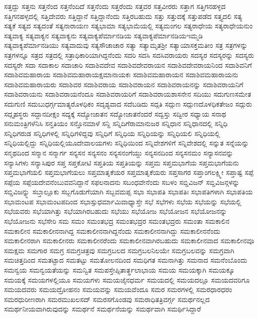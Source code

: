 {ಸತ್ತದ್ದು
ಸತ್ತನು
ಸತ್ತನೆಂದ
ಸತ್ತನೆಂದಿದೆ
ಸತ್ತನೆಂದು
ಸತ್ತರೆಂದು
ಸತ್ತವರ
ಸತ್ತವೀರರು
ಸತ್ತಾಗ
ಸತ್ತಿಗನಹಳ್ಳದ
ಸತ್ತಿಗನಹಳ್ಳದಲ್ಲಿ
ಸತ್ತಿದೇವರು
ಸತ್ತಿದ್ದಾನೆ
ಸತ್ತಿದ್ದಾನೆಂದು
ಸತ್ತಿರಬಹುದು
ಸತ್ತು
ಸತ್ತುದಕ್ಕೆ
ಸತ್ತುಪಡೆದ
ಸತ್ತ್ಯದಲಿ
ಸತ್ಯ
ಸತ್ಯಕೆ
ಸತ್ಯದ
ಸತ್ಯದಂತೆ
ಸತ್ಯನಾರಾಯಣ
ಸತ್ಯಭಾಮಾ
ಸತ್ಯಭಾಮೆಯಲ್ಲಿ
ಸತ್ಯಮಂಗಲ
ಸತ್ಯರಾಧೇಯ
ಸತ್ಯರಾಧೇಯನುಂ
ಸತ್ಯವಾಕ್ಯ
ಸತ್ಯವಾಕ್ಯನ
ಸತ್ಯವಾಕ್ಯನು
ಸತ್ಯವಾಕ್ಯಪೆರ್ಮಾನಡಿಯ
ಸತ್ಯವಾಕ್ಯಪೆರ್ಮಾನಡಿಯಇಮ್ಮಡಿ
ಸತ್ಯವಾಕ್ಯಪೆರ್ಮಾನಡಿಯು
ಸತ್ಯವಾದುವು
ಸತ್ಯಸೌಚಾಚಾರ
ಸತ್ಯಾ
ಸತ್ಯಾಮೃತಶ್ರೀ
ಸತ್ಯಾಯಾಸಕ್ತಮತೀಂ
ಸತ್ರ
ಸತ್ರಗಳನ್ನು
ಸತ್ರಗಳನ್ನೂ
ಸತ್ರದ
ಸತ್ರದಲ್ಲಿ
ಸತ್ರಾಧಿಕಾರಿಯಾಗಿದ್ದನೆಂದು
ಸದರಿ
ಸದಸಿ
ಸದಸಿವರಾಯರು
ಸದಸ್ಯರ
ಸದಸ್ಯರನ್ನು
ಸದಸ್ಯರು
ಸದಸ್ಯರೇ
ಸದಾ
ಸದಾಕಾಲ
ಸದಾಚಾರಿ
ಸದಾಶಿವದೇವ
ಸದಾಶಿವದೇವರಾಯನ
ಸದಾಶಿವದೇವರಾಯನಿಂದ
ಸದಾಶಿವನಿಗೆ
ಸದಾಶಿವಮಹಾರಾಯ
ಸದಾಶಿವಮಹಾರಾಯಕ್ಷಮಾನಾಯಕಃ
ಸದಾಶಿವಮಹಾರಾಯನ
ಸದಾಶಿವಮಹಾರಾಯನು
ಸದಾಶಿವಮಹಾರಾಯರು
ಸದಾಶಿವರ
ಸದಾಶಿವರಾಯ
ಸದಾಶಿವರಾಯನ
ಸದಾಶಿವರಾಯನನ್ನು
ಸದಾಶಿವರಾಯನಿಗೆ
ಸದಾಶಿವರಾಯನು
ಸದಾಶಿವರಾಯನೆಂದೂ
ಸದಾಶಿವರಾಯರಿಗೆ
ಸದಾಶಿವರಾಯಶಾಸನೇನ
ಸದಿಯು
ಸದುಗುಣಸಮೇತ
ಸದುಗುಣಿ
ಸದುಬುಧರ್ಗ್ಗಮಾತ್ಯರೊಳಧಿಕಂ
ಸದೃಶ್ಯವಾದ
ಸದೆಬಡಿದು
ಸದ್ಗತಿ
ಸದ್ಗುಣ
ಸದ್ಗುಣದೊಳಧಿಕತೇಜಂ
ಸದ್ಗುರು
ಸದ್ಗೃಹಸ್ಥರು
ಸದ್ದಾನದೀಕ್ಷಂ
ಸದ್ಯಕ್ಕೆ
ಸದ್ಯೋಜಾತನ
ಸದ್ಯೋಜಾತನೆಂದರೆ
ಸದ್ವಸ್ತು
ಸದ್ವೀರ
ಸಧ್ಯಾಯ
ಸನಾಥ
ಸನುಮಂತ್ರಿಗಳೆನಿಸಿ
ಸನ್ತತಿಯಂ
ಸನ್ತೊನಮಾಳೆ
ಸನ್ದಿ
ಸನ್ನಿದಿಗೆರಾಮಾನುಜರ
ಸನ್ನಿಧಾನ
ಸನ್ನಿಧಾನದಲ್ಲಿ
ಸನ್ನಿಧಿ
ಸನ್ನಿಧಿಗರುಡ
ಸನ್ನಿಧಿಗಳಲ್ಲಿ
ಸನ್ನಿಧಿಗಳಿದ್ದವು
ಸನ್ನಿಧಿಗೆ
ಸನ್ನಿಧಿಯ
ಸನ್ನಿಧಿಯನ್ನು
ಸನ್ನಿಧಿಯಲಿ
ಸನ್ನಿಧಿಯಲ್ಲಿ
ಸನ್ನಿಧಿಯಲ್ಲಿದ್ದು
ಸನ್ನಿಧಿಯಲ್ಲಿಯೂದೇವಾಲಯಗಳು
ಸನ್ನಿಧಿಯಿಂದ
ಸನ್ನಿವೇಶಗಳಿಗೆ
ಸನ್ನಿವೇಶದಲ್ಲಿ
ಸನ್ನುತ
ಸನ್ನೆಯನ್ನು
ಸನ್ಮಥದಿಂದ
ಸನ್ಮಾನ
ಸನ್ಮಾರ್ಗ
ಸನ್ಯಸನ
ಸನ್ಯಸನಂ
ಸನ್ಯಸನಂಗೆಯ್ದು
ಸನ್ಯಸನದಿಂದ
ಸನ್ಯಸನಮಂ
ಸನ್ಯಾಸನವನ್ನು
ಸನ್ಯಾಸಿಗಳು
ಸನ್ಯಾಸಿಪುರ
ಸಪ್ತ
ಸಪ್ತಕೋಟಿ
ಸಪ್ತತಿಯ
ಸಪ್ತತಿಯನ್ನು
ಸಪ್ತಮ
ಸಪ್ತಮಭಾಗೆಯ
ಸಪ್ತಮಭಾಗೆಯನು
ಸಪ್ತಮಭಾಗೆಯಲಿ
ಸಪ್ತಮಭಾಗೆಯಲು
ಸಪ್ತಮಾತೃಕೆಯರ
ಸಪ್ತಮಾತೃಕೆಯರು
ಸಪ್ತಸಾಗರ
ಸಪ್ತಾಂಗಲಕ್ಷ್ಮೀ
ಸಪ್ತಾಷ್ಟ
ಸಪ್ಪೆ
ಸಪ್ಪೆಯ
ಸಪ್ಪೆಯದೇವನೆಂಬುವವನಿದ್ದಾನೆ
ಸಫಲನಾದನು
ಸಬಂಧವೇನೆಂದು
ಸಬಳಂ
ಸಬ್ಡಿವಿಜನ್
ಸಬ್ಡಿವಿಜನ್ಗಳನ್ನು
ಸಬ್ಡಿವಿಜನ್ನ್ನು
ಸಬ್ತಾಲ್ಲೂಕು
ಸಬ್ಬಗೊಡುಗೆಯಾಗಿ
ಸಬ್ಬವಮಪ್ಪ
ಸಭಾ
ಸಭಾಪತಿ
ಸಭಾಪತಿಃ
ಸಭಾಪತಿಗಳಾಗಿ
ಸಭಾಪತಿಯ
ಸಭಾಮಂಟಪ
ಸಭಾಮಂಟಪದಿಂದ
ಸಭಾಸ್ಸುಧರ್ಮಾಮಿವಾಧ್ಯಾಸ್ತೇ
ಸಭೆ
ಸಭೆಗಳು
ಸಭೆಯ
ಸಭೆಯನ್ನು
ಸಭೆಯಲ್ಲಿ
ಸಭೆಯವರು
ಸಭೆಯಾಗಿತ್ತು
ಸಭೆಯಾಗಿರಬಹುದು
ಸಭೆಯು
ಸಭೆಯೋಜ
ಸಭೆಯೋಜನ
ಸಭೆಯೋಜನನ್ನು
ಸಭೆಯೋಜನು
ಸಭೆಸೇರಿ
ಸಮ
ಸಮಂ
ಸಮಂತಭದ್ರ
ಸಮಂತಭದ್ರರ
ಸಮಂತಭದ್ರರು
ಸಮಂತಾ
ಸಮಕಾಲಿನ
ಸಮಕಾಲೀನ
ಸಮಕಾಲೀನನಾಗಿದ್ದ
ಸಮಕಾಲೀನನಾಗಿದ್ದನೆಂದು
ಸಮಕಾಲೀನನಾಗಿದ್ದು
ಸಮಕಾಲೀನನೆಂದು
ಸಮಕಾಲೀನರಾಗಿ
ಸಮಕಾಲೀನರು
ಸಮಕಾಲೀನರೆಂದು
ಸಮಕಾಲೀನವಾಗಿರಬಹುದು
ಸಮಕಾಲೀನವಾದ
ಸಮಕಾಲೀನವೂ
ಸಮಕ್ಷಮ
ಸಮಗಾರ
ಸಮಗ್ರ
ಸಮಗ್ರಚಿತ್ರವು
ಸಮಗ್ರಬಲದ
ಸಮಗ್ರಬಲನಿಲಯೇ
ಸಮಗ್ರಬಲವನ್ನು
ಸಮಗ್ರವಾಗಿ
ಸಮಚಿತ್ತದಿಂದ
ಸಮತಟ್ಟಾದ
ಸಮತಟ್ಟು
ಸಮತೋಲನದಿಂದ
ಸಮಧಿಗತ
ಸಮನಾಗಿತ್ತು
ಸಮನಾದ
ಸಮನೆಂಬೊಂದು
ಸಮನ್ವಯ
ಸಮನ್ವಯತೆಯನ್ನು
ಸಮನ್ವಿತ
ಸಮಪಸ್ತೇಪ್ಸಿತಾರ್ತ್ಥಲಾಭಾಯ
ಸಮಯ
ಸಮಯಕ್ಕಾಗಿ
ಸಮಯಕ್ಕೂ
ಸಮಯಕ್ಕೆ
ಸಮಯಗಳಲ್ಲಿಯೂ
ಸಮಯಗಳು
ಸಮಯಜೈನಧರ್ಮ
ಸಮಯದಲ್ಲಿ
ಸಮಯದಲ್ಲೂ
ಸಮಯದವರಿಗೂ
ಸಮಯದವರು
ಸಮಯದ್ರೋಹನಂ
ಸಮಯವನ್ನು
ಸಮಯವೆಂದೂ
ಸಮರ
ಸಮರಗಳಲ್ಲಿ
ಸಮರಧಾರಧರಂ
ಸಮರಧುರೀಣರಾಗಿ
ಸಮರಮುಖಲಸದ್
ಸಮರಸಗೊಂಡವು
ಸಮರಾಧಿತತ್ರಿವರ್ಗ್ಗ
ಸಮರ್ಥನಲ್ಲದ
ಸಮರ್ಥನೀಯವಾಗಿರುವುದನ್ನು
ಸಮರ್ಥನೆ
ಸಮರ್ಥನೆಯನ್ನು
ಸಮರ್ಥವಾಗಿ
ಸಮರ್ಥಿಸಿದ್ದಾರೆ
}

